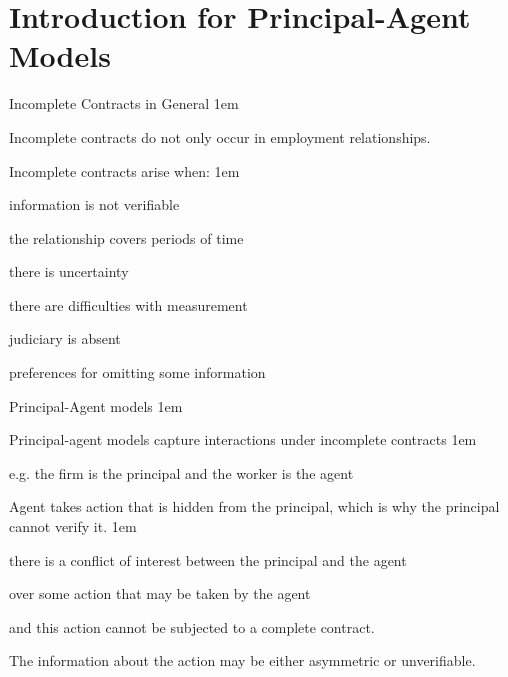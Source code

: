 \documentclass[11pt,aspectratio=43,usenames,dvipsnames]{beamer}
\let\olditemize=\itemize
\let\endolditemize=\enditemize
\renewenvironment{itemize}{\olditemize \itemsep1em}{\endolditemize}
\theoremstyle{definition}
\begin{document}
\section[P\&A]{Introduction for Principal-Agent Models}
\label{sec:Introduction_for_Principal_Agent_Models}

\begin{frame}{Incomplete Contracts in General}
\label{slide:Incomplete_Contracts_in_General}
    \begin{itemize}
        \item Incomplete contracts do not only occur in employment relationships.
        \item Incomplete contracts arise when:
        \begin{itemize}
            \item information is not verifiable
            \item the relationship covers periods of time
            \item there is uncertainty
            \item there are difficulties with measurement
            \item judiciary is absent
            \item preferences for omitting some information
        \end{itemize}

    \end{itemize}

\end{frame}

\begin{frame}{Principal-Agent models}
\label{slide:Principal_Agent_models}
    \begin{itemize}
        \item Principal-agent models capture interactions under incomplete contracts
        \begin{itemize}
            \item e.g. the firm is the principal and the worker is the agent
        \end{itemize}
        \item Agent takes action that is \alert{hidden} from the principal, which is why the principal cannot verify it.
        \begin{itemize}
            \item there is a conflict of interest between the principal and the agent
            \item over some action that may be taken by the agent
            \item and this action cannot be subjected to a complete contract.
        \end{itemize}
        \item The information about the action may be either asymmetric or unverifiable.
    \end{itemize}
\end{frame}
\end{document}
